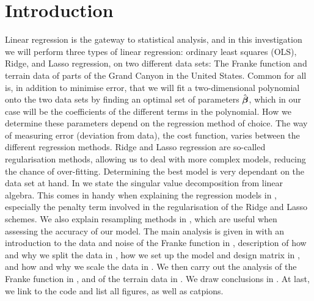 \section{Introduction}\label{sec:intro}
Linear regression is the gateway to statistical analysis, and in this investigation we will perform three types of linear regression: ordinary least squares (OLS), Ridge, and Lasso regression, on two different data sets: The Franke function and terrain data of parts of the Grand Canyon in the United States. Common for all is, in addition to minimise error, that we will fit a two-dimensional polynomial onto the two data sets by finding an optimal set of parameters $\hat{\boldsymbol{\beta}}$, which in our case will be the coefficients of the different terms in the polynomial. How we determine these parameters depend on the regression method of choice. The way of measuring error (deviation from data), the cost function, varies between the different regression methods. Ridge and Lasso regression are so-called regularisation methods, allowing us to deal with more complex models, reducing the chance of over-fitting. Determining the best model is very dependant on the data set at hand. In  we state the singular value decomposition from linear algebra. This comes in handy when explaining the regression models in , especially the penalty term involved in the regularisation of the Ridge and Lasso schemes. We also explain resampling methods in , which are useful when assessing the accuracy of our model. The main analysis is given in  with an introduction to the data and noise of the Franke function in , description of how and why we split the data in , how we set up the model and design matrix in , and how and why we scale the data in . We then carry out the analysis of the Franke function in , and of the terrain data in . We draw conclusions in . At last, we link to the code and list all figures, as well as catpions.